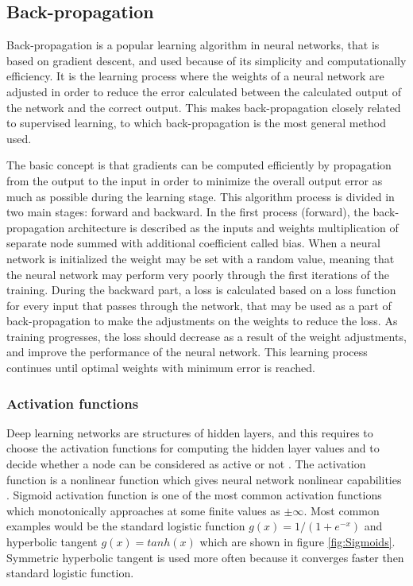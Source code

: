   
\subsection{Back-propagation}
Back-propagation is a popular learning algorithm in neural networks, that is based on gradient descent, and used because of its simplicity and computationally efficiency.\citep{Bengio2012, Duda2000} It is the learning process where the weights of a neural network are adjusted in order to reduce the error calculated between the calculated output of the network and the correct output. This makes back-propagation closely related to supervised learning, to which back-propagation is the most general method used.\citep{Duda2000}  

\noindent
The basic concept is that gradients can be computed efficiently by propagation from the output to the input in order to minimize the overall output error as much as possible during the learning stage. This algorithm process is divided in two main stages: forward and backward. In the first process (forward), the back-propagation architecture is described as the inputs and weights multiplication of separate node summed with additional coefficient called bias.\citep{Hameed2016,LeCun1998} When a neural network is initialized the weight may be set with a random value, meaning that the neural network may perform very poorly through the first iterations of the training.
During the backward part, a loss is calculated based on a loss function for every input that passes through the network, that may be used as a part of back-propagation to make the adjustments on the weights to reduce the loss. As training progresses, the loss should decrease as a result of the weight adjustments, and improve the performance of the neural network.\citep{LeCun2015, Goodfellow2016, Duda2000}   
This learning process continues until optimal weights with minimum error is reached.\citep{Hameed2016}
\noindent

\subsubsection{Activation functions}
Deep learning networks are structures of hidden layers, and this requires to choose the activation functions for computing the hidden layer values and to decide whether a node can be considered as active or not \citep{Goodfellow2016}. The activation function is a nonlinear function which gives neural network nonlinear capabilities \citep{Bengio2012}.\newline
\noindent
Sigmoid activation function is one of the most common activation functions which monotonically approaches at some finite values as $\pm\infty$. Most common examples would be the standard logistic function $g(x) = 1/(1 + e^{-x})$ and hyperbolic tangent $g(x) = tanh(x)$  which are shown in figure \ref{fig:Sigmoids}. Symmetric hyperbolic tangent is used more often because it converges faster then standard logistic function.\citep{Bengio2012}

